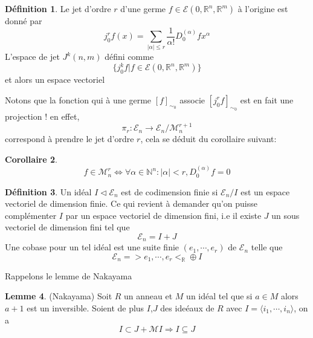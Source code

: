 \documentclass[a4paper,12pt,oneside,titlepage]{article}
\newcommand{\R}[0]{\mathbb{R}}
\theoremstyle{definition}
\newtheorem{definition}{Définition}[section]
\newtheorem{lemme}[definition]{Lemme}
\theoremstyle{plain}
\newtheorem{corollaire}[definition]{Corollaire}
\begin{document}
\begin{definition}
    Le jet d'ordre $r$ d'une germe $f\in\mathcal{E}(0,\R^n,\R^m)$ à l'origine est donné par
    \begin{equation*}
        j^r_{0}f(x)=\sum_{ |\alpha|\leq r} \frac{1}{\alpha !} D^{(\alpha)}_{0}fx^{\alpha}
    \end{equation*}
    L'espace de jet  $J^k(n,m)$ défini comme
    \begin{equation*}
        \{j^k_0 f | f\in \mathcal{E}(0,\R^n,\R^m)\}
    \end{equation*}
    et alors un espace vectoriel
\end{definition}

Notons que la fonction qui à une germe $[f]_{\sim_0}$ associe $[j_0^rf]_{\sim_0}$  est en fait une projection ! 
en effet,
\begin{equation*}
    \pi_r :\mathcal{E}_n\rightarrow \mathcal{E}_n/\mathcal{M}_n^{r+1}
\end{equation*}
correspond  à prendre le jet d'ordre $r$, cela se déduit du corollaire suivant:

\begin{corollaire}
    \begin{equation*}
        f\in\mathcal{M}_n^r\Leftrightarrow
        \forall \alpha\in\mathbb{N}^n : |\alpha|< r, D_0^{(\alpha)}f=0 
    \end{equation*}
\end{corollaire}

\begin{definition}
    Un idéal $I\triangleleft \mathcal{E}_n$ est de codimension finie si $\mathcal{E}_n/I$ est un espace vectoriel de dimension finie. Ce qui revient à demander qu'on puisse complémenter $I$ par un espace vectoriel de dimension fini, i.e il existe $J$ un sous vectoriel de dimension fini tel que 
    \begin{equation*}
        \mathcal{E}_n=I+J
    \end{equation*}
    Une cobase pour un tel idéal est une suite finie $(e_1,\cdots,e_r)$ de $\mathcal{E}_n$ telle que
    \begin{equation*}
        \mathcal{E}_n=\big> e_1,\cdots,e_r\big<_{\R}\oplus I
    \end{equation*}
\end{definition}
Rappelons le lemme de Nakayama
\begin{lemme}(Nakayama)
    Soit $R$ un anneau et $M$ un idéal tel que si $a\in M$ alors $a+1$ est un inversible. Soient de plus $I$,$J$ des ideéaux de $R$ avec 
    $I=\langle i_1,\cdots,i_n\rangle $, on a 
    \begin{equation*}
        I\subset J+\mathcal{M}I \Rightarrow I\subseteq J 
    \end{equation*}
\end{lemme}
\end{document}
